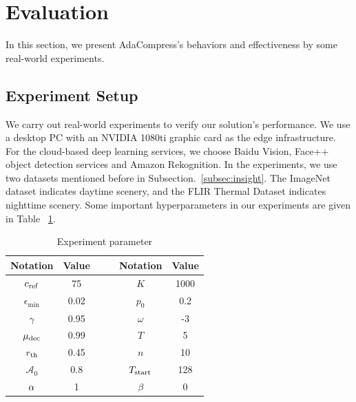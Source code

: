 \section{Evaluation}
\label{Section: evaluation}

In this section, we present AdaCompress's behaviors and effectiveness by some real-world experiments. %

\subsection{Experiment Setup}

We carry out real-world experiments to verify our solution's performance. We use a desktop PC with an NVIDIA 1080ti graphic card as the edge infrastructure. For the cloud-based deep learning services, we choose Baidu Vision, Face++ object detection services and Amazon Rekognition. In the experiments, we use two datasets mentioned before in Subsection.~\ref{subsec:insight}. The ImageNet dataset indicates daytime scenery, and the FLIR Thermal Dataset indicates nighttime scenery. Some important hyperparameters in our experiments are given in Table ~\ref{tab: parameters}.

\begin{table}[!t]
	\centering
	\caption{Experiment parameter}
	\label{tab: parameters}
	\begin{tabular}{cccccc}
		\toprule
		Notation          & Value & & & Notation     & Value  \\ \midrule
		$c_{\rm ref}$ & 75    & & & $K$      & 1000   \\
		$\epsilon_{\min}$    & 0.02  & & & $p_0$    & 0.2    \\
		$\gamma$      & 0.95  & & & $\omega$ & -3   \\
		$ \mu_{\rm dec} $ & 0.99 & & & $ T $ & 5  \\
		$r_{\rm th}$  & 0.45   & & &   $ n  $  &  10      \\ 
		{\color{revise} $ \mathcal{A}_0 $} & {\color{revise}0.8} & & & {\color{revise}$ T_{\rm start} $} & {\color{revise}128} \\
		$ {\color{revise}\alpha} $ & {\color{revise}1} & & & {\color{revise}$ \beta $} & {\color{revise}0}  \\ \bottomrule
	\end{tabular}
\end{table}

